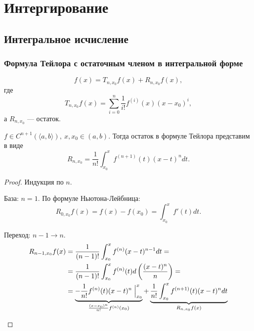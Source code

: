 % 
% 

\chapter{Интергирование}
\section{Интегральное исчисление}

\subsection{Формула Тейлора с остаточным членом в интегральной форме}
\[
    f(x)  = T_{n, x_0} f(x) + R_{n, x_0} f(x) 
,\] 
где 
\[
    T_{n, x_0} f(x) = \sum_{i=0}^{n} \frac{1}{i!} f^{(i)}(x) (x-x_0)^{i}
,\] 
а $ R_{n, x_0}$ --- остаток.
\begin{thm}
    $ f \in  C^{n+1} (\langle a, b \rangle), ~ x, x_0 \in  (a, b)$. Тогда остаток в формуле Тейлора представим в виде
    \[
	R_{n, x_0} =\frac{1}{n!} \int_{x_0}^{x} f^{(n+1)}(t) (x-t)^{n} dt 
    .\] 
\end{thm}
\begin{proof}
    Индукция по $n$.
    $ $
    \begin{description}
        \item База: $ n=1$. 
	    По формуле Ньютона-Лейбница:
	    \[
		R_{0, x_0} f(x) = f(x) - f(x_0) = \int_{x_0}^{x} f'(t) dt 
	    .\] 
        \item Переход: $ n-1 \to n$. 
	    \begin{align*}
		R_{n-1, x_0} f(x) &= \frac{1}{(n-1)!} \int_{x_0}^{x} f^{(n)}(x-t)^{n-1}dt = \\
				  & = \frac{1}{(n-1)!} \int_{x_0}^{x}  f^{(n)}(t) d \left( \frac{(x-t)^{n}}{n} \right)  = \\
				  & = \underbrace{-\frac{1}{n!} f^{(n)}(t)(x-t)^{n} \Bigm |_{x_0}^{x}}_{\frac{(x-x_0)^{n}}{n!} f^{(n)}(x_0)} + \underbrace{\frac{1}{n!}  \int_{x_0}^{x} f^{(n+1)}(t) (x-t)^{n}dt}_{R_{n, x_0}f(x)}
	    \end{align*}
    \end{description} 
\end{proof}
